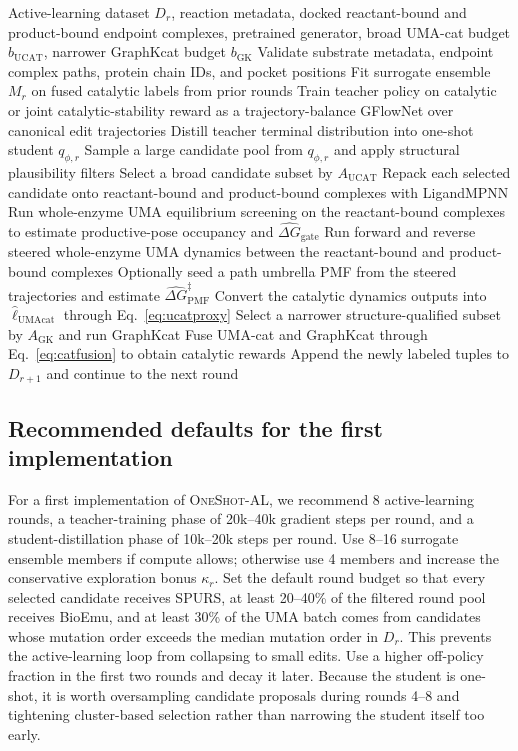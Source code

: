 \documentclass[11pt]{article}
\newcommand{\methodIII}{\textsc{OneShot-AL}}
\begin{document}
	\begin{algorithm}[H]
		\caption{Catalytic \methodIII{} round with whole-enzyme UMA and GraphKcat}
		\label{alg:method3_kcat}
		\begin{algorithmic}[1]
			\Require Active-learning dataset $D_r$, reaction metadata, docked reactant-bound and product-bound endpoint complexes, pretrained generator, broad UMA-cat budget $b_{\mathrm{UCAT}}$, narrower GraphKcat budget $b_{\mathrm{GK}}$
			\State Validate substrate metadata, endpoint complex paths, protein chain IDs, and pocket positions
			\State Fit surrogate ensemble $M_r$ on fused catalytic labels from prior rounds
			\State Train teacher policy on catalytic or joint catalytic-stability reward as a trajectory-balance GFlowNet over canonical edit trajectories
			\State Distill teacher terminal distribution into one-shot student $q_{\phi,r}$
			\State Sample a large candidate pool from $q_{\phi,r}$ and apply structural plausibility filters
			\State Select a broad candidate subset by $A_{\mathrm{UCAT}}$
			\State Repack each selected candidate onto reactant-bound and product-bound complexes with LigandMPNN
			\State Run whole-enzyme UMA equilibrium screening on the reactant-bound complexes to estimate productive-pose occupancy and $\widehat{\Delta G}_{\mathrm{gate}}$
			\State Run forward and reverse steered whole-enzyme UMA dynamics between the reactant-bound and product-bound complexes
			\State Optionally seed a path umbrella PMF from the steered trajectories and estimate $\widehat{\Delta G}_{\mathrm{PMF}}^\ddagger$
			\State Convert the catalytic dynamics outputs into $\widehat \ell_{\mathrm{UMAcat}}$ through Eq.~\eqref{eq:ucatproxy}
			\State Select a narrower structure-qualified subset by $A_{\mathrm{GK}}$ and run GraphKcat
			\State Fuse UMA-cat and GraphKcat through Eq.~\eqref{eq:catfusion} to obtain catalytic rewards
			\State Append the newly labeled tuples to $D_{r+1}$ and continue to the next round
		\end{algorithmic}
	\end{algorithm}
	
	\subsection{Recommended defaults for the first implementation}
	
	For a first implementation of \methodIII{}, we recommend 8 active-learning rounds, a teacher-training phase of 20k--40k gradient steps per round, and a student-distillation phase of 10k--20k steps per round. Use 8--16 surrogate ensemble members if compute allows; otherwise use 4 members and increase the conservative exploration bonus $\kappa_r$. Set the default round budget so that every selected candidate receives SPURS, at least 20--40\% of the filtered round pool receives BioEmu, and at least 30\% of the UMA batch comes from candidates whose mutation order exceeds the median mutation order in $D_r$. This prevents the active-learning loop from collapsing to small edits. Use a higher off-policy fraction in the first two rounds and decay it later. Because the student is one-shot, it is worth oversampling candidate proposals during rounds 4--8 and tightening cluster-based selection rather than narrowing the student itself too early.
	
\end{document}
